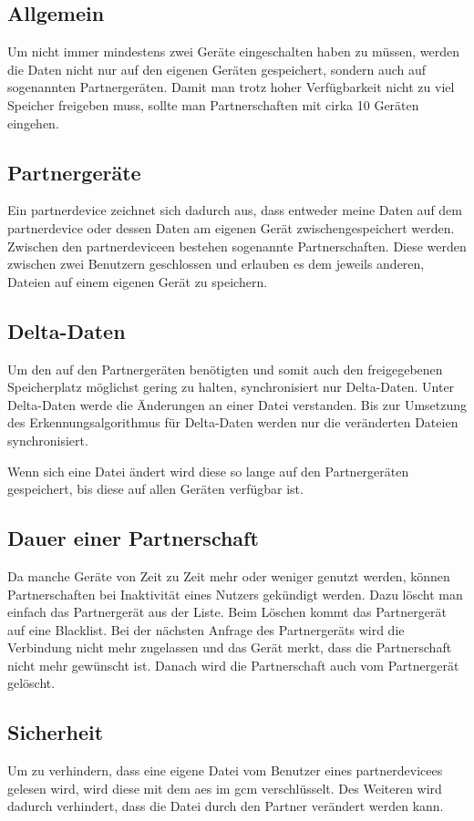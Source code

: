 \subsection{Allgemein}
Um nicht immer mindestens zwei Geräte eingeschalten haben zu müssen, werden die
Daten nicht nur auf den eigenen Geräten gespeichert, sondern auch auf sogenannten
Partnergeräten. Damit man trotz hoher Verfügbarkeit nicht zu viel Speicher freigeben
muss, sollte man Partnerschaften mit cirka 10 Geräten eingehen.

\subsection{Partnergeräte} \label{Partnergerät}
Ein \gls{partnerdevice} zeichnet sich dadurch aus, dass entweder meine Daten auf
dem \gls{partnerdevice} oder dessen Daten am eigenen Gerät zwischengespeichert werden.
Zwischen den \gls{partnerdevice}en bestehen sogenannte Partnerschaften. Diese werden
zwischen zwei Benutzern geschlossen und erlauben es dem jeweils anderen, Dateien auf
einem eigenen Gerät zu speichern.

\subsection{Delta-Daten}
Um den auf den Partnergeräten benötigten und somit auch den freigegebenen Speicherplatz
möglichst gering zu halten, synchronisiert \sblit nur Delta-Daten. Unter Delta-Daten
werde die Änderungen an einer Datei verstanden. Bis zur Umsetzung des
Erkennungsalgorithmus für Delta-Daten werden nur die veränderten Dateien synchronisiert.

Wenn sich eine Datei ändert wird diese so lange auf den Partnergeräten gespeichert,
bis diese auf allen Geräten verfügbar ist.

\subsection{Dauer einer Partnerschaft}
Da manche Geräte von Zeit zu Zeit mehr oder weniger genutzt werden, können Partnerschaften
bei Inaktivität eines Nutzers gekündigt werden. Dazu löscht man einfach das Partnergerät
aus der Liste. Beim Löschen kommt das Partnergerät auf eine Blacklist. Bei der nächsten
Anfrage des Partnergeräts wird die Verbindung nicht mehr zugelassen und das Gerät merkt,
dass die Partnerschaft nicht mehr gewünscht ist. Danach wird die Partnerschaft auch vom
Partnergerät gelöscht.

\subsection{Sicherheit} \label{sicherheit}
Um zu verhindern, dass eine eigene Datei vom Benutzer eines \gls{partnerdevice}es gelesen wird,
wird diese mit dem \gls{aes} im \gls{gcm} verschlüsselt. Des Weiteren wird dadurch
verhindert, dass die Datei durch den Partner verändert werden kann.

